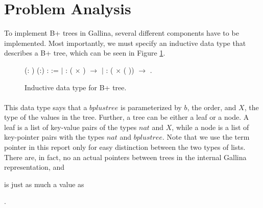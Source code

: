 \section{Problem Analysis}
\label{sec:ProblemAnalysis}
To implement B+ trees in Gallina, several different components have to be implemented. Most importantly, we must specify an inductive data type that describes a B+ tree, which can be seen in Figure \ref{fig:inductive_data_type}.

\begin{figure}
\centering
\begin{coqdoccode}
  (: ) (:) :  :=\coqdoceol
\coqdocindent{1.00em}
\ensuremath{|}  :  ( \ensuremath{\times} ) \ensuremath{\rightarrow}   \coqdoceol
\coqdocindent{1.00em}
\ensuremath{|}  :  ( \ensuremath{\times} (  )) \ensuremath{\rightarrow}   .\coqdoceol
\end{coqdoccode}
\caption{Inductive data type for B+ tree.}
\label{fig:inductive_data_type}
\end{figure}

\paragraph{}
This data type says that a $bplustree$ is parameterized by $b$, the order, and $X$, the type of the values in the tree. Further, a tree can be either a leaf or a node. A leaf is a list of key-value pairs of the types $nat$ and $X$, while a node is a list of key-pointer pairs with the types $nat$ and $bplustree$. Note that we use the term pointer in this report only for easy distinction between the two types of lists. There are, in fact, no an actual pointers between trees in the internal Gallina representation, and \begin{coqdoccode}  \end{coqdoccode} is just as much a value as \begin{coqdoccode} \end{coqdoccode}.


